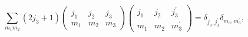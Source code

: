 \[\sum_{m_{1}m_{2}}(2j_{3}+1)\begin{pmatrix}j_{1}&j_{2}&j_{3}\\
m_{1}&m_{2}&m_{3}\end{pmatrix}\begin{pmatrix}j_{1}&j_{2}&j^{\prime}_{3}\\
m_{1}&m_{2}&m^{\prime}_{3}\end{pmatrix}=\delta_{j_{3},j^{\prime}_{3}}\delta_{m%
_{3},m^{\prime}_{3}},\]